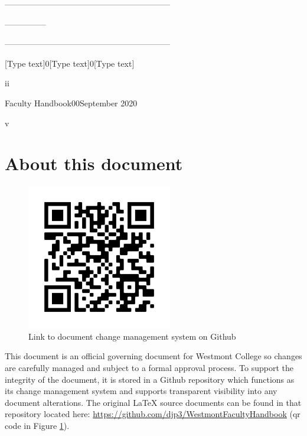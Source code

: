 \documentclass[letterpaper, 11pt]{article}
\begin{document}
		------------------------------------------------------------

		---------------

		------------------------------------------------------------

		[Type text]0[Type text]0[Type text]







		ii


		Faculty Handbook00September 2020

		v



\section{About this document}
	\begin{figure}
		\vspace{-30pt}
		\begin{centering}
			\includegraphics[width=2.5in]{images/qr_code_github_repo.png}
		\end{centering}
		\vspace{-30pt}
		\caption{Link to document change management system on Github}
		\label{fig:qr_repo}
		\vspace{-10pt}
	\end{figure}
	This document is an official governing document for Westmont College so changes are carefully managed and subject to a formal approval process.
	To support the integrity of the document, it is stored in a Github repository which functions as its change management system and supports transparent visibility into any document alterations.
	The original LaTeX source documents can be found in that repository located here: \href{https://github.com/djp3/WestmontFacultyHandbook}{https://github.com/djp3/WestmontFacultyHandbook} (qr code in Figure \ref{fig:qr_repo}).
\end{document}

